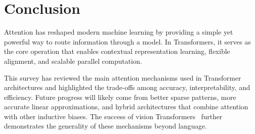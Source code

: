 \documentclass[a4paper,11pt]{article}
\begin{document}
\section{Conclusion}

Attention has reshaped modern machine learning by providing a simple yet powerful way to route information through a model. In Transformers, it serves as the core operation that enables contextual representation learning, flexible alignment, and scalable parallel computation.

This survey has reviewed the main attention mechanisms used in Transformer architectures and highlighted the trade-offs among accuracy, interpretability, and efficiency. Future progress will likely come from better sparse patterns, more accurate linear approximations, and hybrid architectures that combine attention with other inductive biases. The success of vision Transformers~\cite{dosovitskiy2021image} further demonstrates the generality of these mechanisms beyond language.



\end{document}
